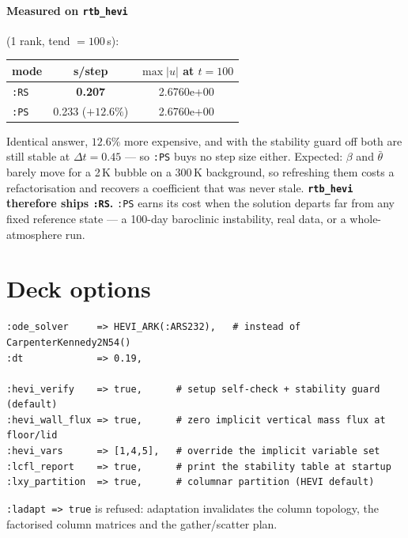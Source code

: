 \documentclass[11pt,a4paper]{article}
\begin{document}
\paragraph{Measured on \texttt{rtb\_hevi}} (1 rank, tend $=100$\,s):
\begin{center}
\begin{tabular}{lcc}
\toprule
mode & s/step & $\max|u|$ at $t=100$\\
\midrule
\texttt{:RS} & \textbf{0.207} & 2.6760e+00\\
\texttt{:PS} & 0.233 ($+12.6\%$) & 2.6760e+00\\
\bottomrule
\end{tabular}
\end{center}
Identical answer, $12.6\%$ more expensive, and with the stability guard off both
are still stable at $\Delta t = 0.45$ --- so \texttt{:PS} buys no step size
either. Expected: $\beta$ and $\bar\theta$ barely move for a 2\,K bubble on a
300\,K background, so refreshing them costs a refactorisation and recovers a
coefficient that was never stale. \textbf{\texttt{rtb\_hevi} therefore ships
\texttt{:RS}.} \texttt{:PS} earns its cost when the solution departs far from
any fixed reference state --- a 100-day baroclinic instability, real data, or a
whole-atmosphere run.

\section{Deck options}
\begin{lstlisting}
:ode_solver     => HEVI_ARK(:ARS232),   # instead of CarpenterKennedy2N54()
:dt             => 0.19,

:hevi_verify    => true,      # setup self-check + stability guard (default)
:hevi_wall_flux => true,      # zero implicit vertical mass flux at floor/lid
:hevi_vars      => [1,4,5],   # override the implicit variable set
:lcfl_report    => true,      # print the stability table at startup
:lxy_partition  => true,      # columnar partition (HEVI default)
\end{lstlisting}
\texttt{:ladapt => true} is refused: adaptation invalidates the column
topology, the factorised column matrices and the gather/scatter plan.

\end{document}
